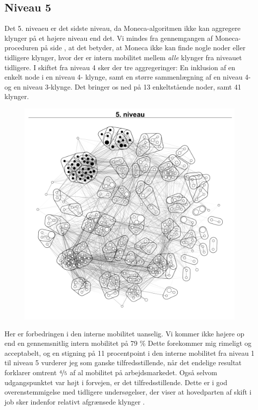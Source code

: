 \newpage \subsection{Niveau 5 \label{delanalyse1_endelige mobilitetskort}}

Det 5. niveaeu er det sidste niveau, da Moneca-algoritmen ikke kan aggregere klynger på et højere niveau end det. Vi mindes fra gennemgangen af Moneca-proceduren på side  \pageref{metode_monecastepbystep}, at det betyder, at Moneca ikke kan finde nogle noder eller tidligere klynger, hvor der er intern mobilitet mellem  \emph{alle} klynger fra niveauet tidligere. %
I skiftet fra niveau 4 sker der tre aggregeringer: En inklusion af en enkelt node i en niveau 4- klynge, samt en større sammenlægning af en niveau 4- og en niveau 3-klynge. Det bringer os ned på 13 enkeltstående noder, samt 41 klynger. 

\begin{figure}[H]
\begin{centering}
  \includegraphics[width=10 cm]{fig/netvaerkskort/kort_seg_proces5.pdf}
  \label{fig_delanalyse1_kort_seg_proces5}
  \caption{}
\end{centering}
\end{figure}

Her er forbedringen i den interne mobilitet uanselig. Vi kommer ikke højere op end  en gennemsnitlig intern mobilitet på 79 \% Dette forekommer mig rimeligt og acceptabelt, og en stigning på 11 procentpoint i den interne mobilitet fra niveau 1 til niveau 5 vurderer jeg som ganske tilfredsstillende, når det endelige resultat forklarer omtrent $\nicefrac{4}{5}$ af al mobilitet på arbejdsmarkedet. Også selvom udgangspunktet var højt i forvejen, er det tilfredsstillende. Dette er i god overenstemmigelse med tidligere undersøgelser, der viser at hovedparten af skift i job sker indenfor relativt afgrænsede klynger \parencite[124]{BojeToft1989}. 

